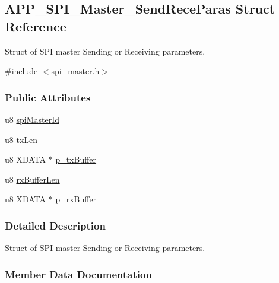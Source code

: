 \hypertarget{struct_a_p_p___s_p_i___master___send_rece_paras}{}\subsection{A\+P\+P\+\_\+\+S\+P\+I\+\_\+\+Master\+\_\+\+Send\+Rece\+Paras Struct Reference}
\label{struct_a_p_p___s_p_i___master___send_rece_paras}


Struct of S\+PI master Sending or Receiving parameters.  




{\ttfamily \#include $<$spi\+\_\+master.\+h$>$}

\subsubsection*{Public Attributes}
\begin{DoxyCompactItemize}
\item 
u8 \hyperlink{struct_a_p_p___s_p_i___master___send_rece_paras_a0dbaca828a31446c91c8cb32bdf9ddc1}{spi\+Master\+Id}
\item 
u8 \hyperlink{struct_a_p_p___s_p_i___master___send_rece_paras_a5fc24315bb20c17b9afe30da64cf882e}{tx\+Len}
\item 
u8 X\+D\+A\+TA $\ast$ \hyperlink{struct_a_p_p___s_p_i___master___send_rece_paras_af1f4d38a7d60a53c5b776e32cc0a4de8}{p\+\_\+tx\+Buffer}
\item 
u8 \hyperlink{struct_a_p_p___s_p_i___master___send_rece_paras_a8d292261dc155123f11a8b075aad29c2}{rx\+Buffer\+Len}
\item 
u8 X\+D\+A\+TA $\ast$ \hyperlink{struct_a_p_p___s_p_i___master___send_rece_paras_af2dc90f15f34abdd9b3c24d993b45260}{p\+\_\+rx\+Buffer}
\end{DoxyCompactItemize}


\subsubsection{Detailed Description}
Struct of S\+PI master Sending or Receiving parameters. 

\subsubsection{Member Data Documentation}
